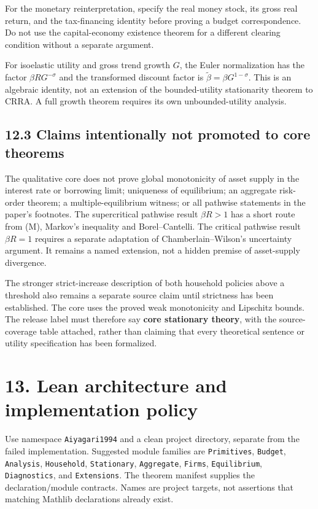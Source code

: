 \documentclass[
  11pt,
]{article}
\begin{document}
For the monetary reinterpretation, specify the real money stock, its
gross real return, and the tax-financing identity before proving a
budget correspondence. Do not use the capital-economy existence theorem
for a different clearing condition without a separate argument.

For isoelastic utility and gross trend growth \(G\), the Euler
normalization has the factor \(\beta R G^{-\sigma}\) and the transformed
discount factor is \(\widetilde\beta=\beta G^{1-\sigma}\). This is an
algebraic identity, not an extension of the bounded-utility stationarity
theorem to CRRA. A full growth theorem requires its own
unbounded-utility analysis.

\subsection{12.3 Claims intentionally not promoted to core
theorems}\label{claims-intentionally-not-promoted-to-core-theorems}

The qualitative core does not prove global monotonicity of asset supply
in the interest rate or borrowing limit; uniqueness of equilibrium; an
aggregate risk-order theorem; a multiple-equilibrium witness; or all
pathwise statements in the paper's footnotes. The supercritical pathwise
result \(\beta R>1\) has a short route from (M), Markov's inequality and
Borel--Cantelli. The critical pathwise result \(\beta R=1\) requires a
separate adaptation of Chamberlain--Wilson's uncertainty argument. It
remains a named extension, not a hidden premise of asset-supply
divergence.

The stronger strict-increase description of both household policies
above a threshold also remains a separate source claim until strictness
has been established. The core uses the proved weak monotonicity and
Lipschitz bounds. The release label must therefore say \textbf{core
stationary theory}, with the source-coverage table attached, rather than
claiming that every theoretical sentence or utility specification has
been formalized.

\section{13. Lean architecture and implementation
policy}\label{lean-architecture-and-implementation-policy}

Use namespace \texttt{Aiyagari1994} and a clean project directory,
separate from the failed implementation. Suggested module families are
\texttt{Primitives}, \texttt{Budget}, \texttt{Analysis},
\texttt{Household}, \texttt{Stationary}, \texttt{Aggregate},
\texttt{Firms}, \texttt{Equilibrium}, \texttt{Diagnostics}, and
\texttt{Extensions}. The theorem manifest supplies the
declaration/module contracts. Names are project targets, not assertions
that matching Mathlib declarations already exist.
\end{document}
